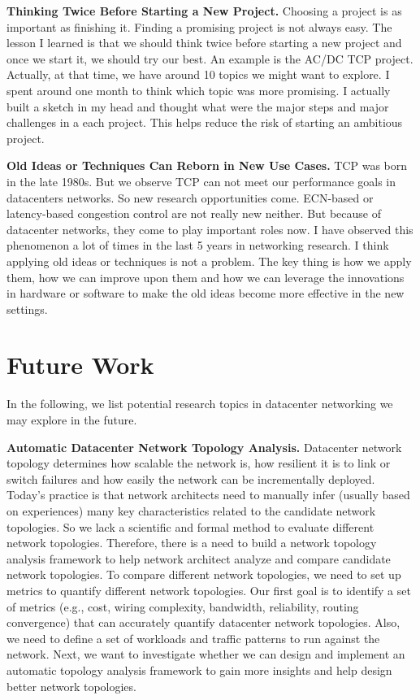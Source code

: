 {\bf Thinking Twice Before Starting a New Project.}
Choosing a project is as important as finishing it. Finding a promising project is not always easy. 
The lesson I learned is that we should think twice before starting a new project and once we start it, we  should 
try our best. An example is the AC/DC TCP project. 
Actually, at that time, we have around 10 topics we might want to explore. 
I spent around one month to think which topic was more promising. I actually built a sketch in my head and 
thought what were the major steps and major challenges in a each project. 
This helps reduce the risk of starting an ambitious project.

{\bf Old Ideas or Techniques Can Reborn in New Use Cases.}
TCP was born in the late 1980s. But we observe TCP can not meet our performance goals in datacenters networks. 
So new research opportunities come. ECN-based or latency-based congestion control are not really new neither. 
But because of datacenter networks, they come to play important roles now. 
I have observed this phenomenon a lot of times in the last 5 years in networking research. 
I think applying old ideas or techniques is not a problem. The key thing is how we 
apply them, how we can improve upon them and how we can leverage the 
innovations in hardware or software to make the old 
ideas become more effective in the new settings. 

\section{Future Work}
In the following, we list potential research topics in datacenter networking we may explore in the future.

{\bf Automatic Datacenter Network Topology Analysis.}
Datacenter network topology determines how scalable the network is,
how resilient it is to link or switch failures and how easily the network
can be incrementally deployed. Today's practice is that network architects need to
manually infer (usually based on experiences) many key characteristics related to
the candidate network topologies. So we lack a scientific and formal method to
evaluate different network topologies. Therefore, there is a need to build a network
topology analysis framework to help network architect analyze and compare
candidate network topologies. To compare different network topologies, we need to
set up metrics to quantify different network topologies. Our first goal is to
identify a set of metrics (e.g., cost, wiring complexity, bandwidth, reliability, routing convergence) that
can accurately quantify datacenter network topologies.  Also, we need to define a set of workloads
and traffic patterns to run against the network. 
Next, we want to investigate whether we can design and implement
an automatic topology analysis framework to gain more insights and help design better network topologies.

